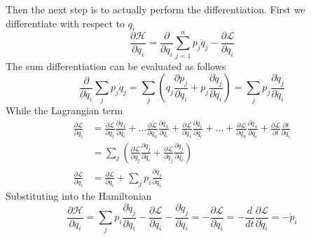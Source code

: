 \documentclass[../../../main.tex]{subfiles}
\begin{document}
Then the next step is to actually perform the differentiation.
First we differentiate with respect to $q_i$
\begin{equation*}
	\frac{\partial \mathcal{H}}{\partial q_i}=\frac{\partial}{\partial q_i}\sum_{j=1}^{n}p_j\dot{q}_j-\frac{\partial \mathcal{L}}{\partial q_i}
\end{equation*}
The sum differentiation can be evaluated as follows
\begin{equation*}
	\frac{\partial}{\partial q_i}\sum_{j}p_j\dot{q}_j=\sum_j\left(\dot{q}_j\frac{\partial p_j}{\partial q_i}+p_j\frac{\partial\dot{q}_j}{\partial q_i}\right)=\sum_jp_j\frac{\partial \dot{q}_j}{\partial q_i}
\end{equation*}
While the Lagrangian term
\begin{align*}
	\frac{\partial \mathcal{L}}{\partial q_i} & =\frac{\partial \mathcal{L}}{\partial q_1}\frac{\partial q_1}{\partial q_i}+\dots\frac{\partial\mathcal{L}}{\partial q_n}\frac{\partial q_n}{\partial q_i}+\frac{\partial\mathcal{L}}{\partial \dot{q}_1}\frac{\partial\dot{q}_1}{\partial \dot{q}_i}+\dots+\frac{\partial \mathcal{L}}{\partial \dot{q}_n}\frac{\partial \dot{q}_n}{\partial q_i}+\frac{\partial\mathcal{L}}{\partial t}\frac{\partial t}{\partial q_i} \\
	                                          & =\sum_j\left(\frac{\partial\mathcal{L}}{\partial q_j}\frac{\partial q_j}{\partial q_i}+\frac{\partial\mathcal{L}}{\partial \dot{q}_j}\frac{\partial \dot{q}_j}{\partial q_i}\right)                                                                                                                                                                                                                                      \\
	\frac{\partial \mathcal{L}}{\partial q_i} & =\frac{\partial\mathcal{L}}{\partial q_i}+\sum_jp_i\frac{\partial \dot{q}_j}{\partial q_i}
\end{align*}
Substituting into the Hamiltonian
\begin{equation*}
	\frac{\partial \mathcal{H}}{\partial q_i}=\sum_jp_i\frac{\partial \dot{q}_j}{\partial q_i}-\frac{\partial \mathcal{L}}{\partial q_i}-\frac{\partial \dot{q}_j}{\partial q_i}=-\frac{\partial \mathcal{L}}{\partial q_i}=-\frac{d}{dt}\frac{\partial\mathcal{L}}{\partial \dot{q_i}}=-\dot{p}_i
\end{equation*}
\end{document}
